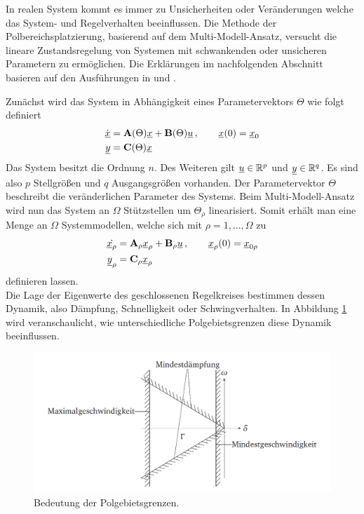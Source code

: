 In realen System kommt es immer zu Unsicherheiten oder Veränderungen welche das System- und Regelverhalten beeinflussen.
Die Methode der Polbereichsplatzierung, basierend auf dem  Multi-Modell-Ansatz, versucht die lineare Zustandsregelung von Systemen mit schwankenden oder unsicheren Parametern zu ermöglichen.
Die Erklärungen im nachfolgenden Abschnitt basieren auf den Ausführungen in \cite{RobReg} und \cite{Schaub}.

Zunächst wird das System in Abhängigkeit eines Parametervektors $\Theta$ wie folgt definiert
\begin{align}
	\dot{\underline{x}} &= \textbf{A}(\Theta)\underline{x} + \textbf{B}(\Theta)\underline{u}\, , \qquad \underline{x}(0) = \underline{x}_0\\
	\underline{y} 		&= \textbf{C}(\Theta)\underline{x}
\end{align}
Das System besitzt die Ordnung $n$. Des Weiteren gilt $\underline{u}\in\mathbb{R}^p$ und $\underline{y}\in\mathbb{R}^q$. Es sind also $p$ Stellgrößen und $q$ Ausgangsgrößen vorhanden.
Der Parametervektor $\Theta$ beschreibt die veränderlichen Parameter des Systems. Beim Multi-Modell-Ansatz wird nun das System an $\Omega$ Stützstellen um $\Theta_{\rho}$ linearisiert. Somit erhält man eine Menge an $\Omega$ Systemmodellen, welche sich mit $\rho = 1,...,\Omega$ zu 
\begin{align}
	\dot{\underline{x}_{\rho}} &= \textbf{A}_\rho \underline{x}_{\rho} + \textbf{B}_\rho\underline{u}\, , \qquad \underline{x}_{\rho}(0) = \underline{x}_{0\rho}\\
	\underline{y}_{\rho} 		 &= \textbf{C}_\rho\underline{x}_{\rho}
\end{align}
definieren lassen.\\
Die Lage der Eigenwerte des geschlossenen Regelkreises bestimmen dessen Dynamik, also Dämpfung, Schnelligkeit oder Schwingverhalten. In Abbildung \ref{fig:BedPolgebGrenzen} wird veranschaulicht, wie unterschiedliche Polgebietsgrenzen diese Dynamik beeinflussen. 
\begin{figure}[h]
	\centering
	\includegraphics[width=\textwidth]{./Bilder/BedPolgebGrenzen.png}
	\caption{Bedeutung der Polgebietsgrenzen.\cite{RobReg}}
	\label{fig:BedPolgebGrenzen}
\end{figure}
